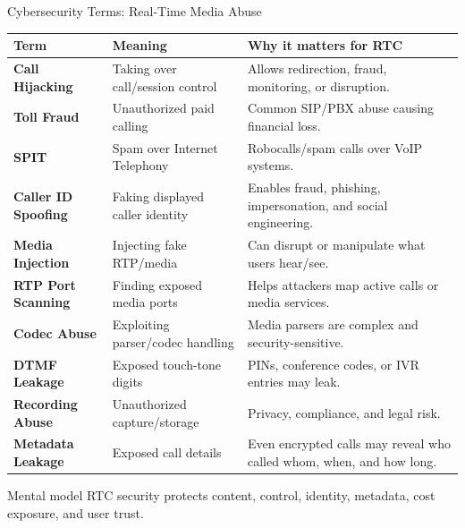 \documentclass[aspectratio=169]{beamer}
\begin{document}
\begin{frame}{Cybersecurity Terms: Real-Time Media Abuse}
\tiny
\begin{tabular}{p{2.2cm} p{3.5cm} p{6.5cm}}
\toprule
\textbf{Term} & \textbf{Meaning} & \textbf{Why it matters for RTC} \\
\midrule
\textbf{Call Hijacking} & Taking over call/session control & Allows redirection, fraud, monitoring, or disruption. \\
\textbf{Toll Fraud} & Unauthorized paid calling & Common SIP/PBX abuse causing financial loss. \\
\textbf{SPIT} & Spam over Internet Telephony & Robocalls/spam calls over VoIP systems. \\
\textbf{Caller ID Spoofing} & Faking displayed caller identity & Enables fraud, phishing, impersonation, and social engineering. \\
\textbf{Media Injection} & Injecting fake RTP/media & Can disrupt or manipulate what users hear/see. \\
\textbf{RTP Port Scanning} & Finding exposed media ports & Helps attackers map active calls or media services. \\
\textbf{Codec Abuse} & Exploiting parser/codec handling & Media parsers are complex and security-sensitive. \\
\textbf{DTMF Leakage} & Exposed touch-tone digits & PINs, conference codes, or IVR entries may leak. \\
\textbf{Recording Abuse} & Unauthorized capture/storage & Privacy, compliance, and legal risk. \\
\textbf{Metadata Leakage} & Exposed call details & Even encrypted calls may reveal who called whom, when, and how long. \\
\bottomrule
\end{tabular}

\vspace{0.15cm}
\begin{block}{Mental model}
RTC security protects content, control, identity, metadata, cost exposure, and user trust.
\end{block}
\end{frame}
\end{document}
